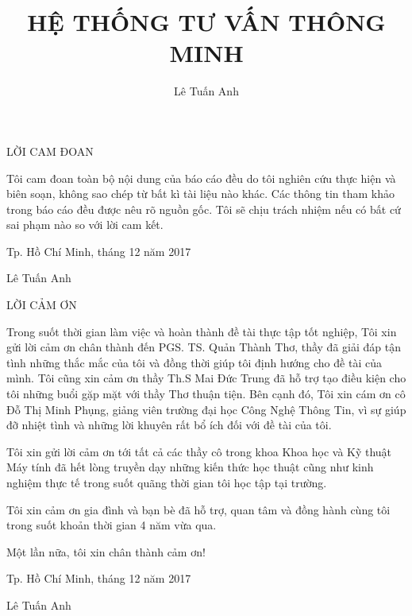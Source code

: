 \documentclass[a4paper,12pt,numbered,print,index,custombib, oneside, custommargin]{report}
\title{HỆ THỐNG TƯ VẤN THÔNG MINH}
\author{Lê Tuấn Anh}
\begin{document}
\maketitle
\begin{center}
\Huge{LỜI CAM ĐOAN}
\end{center}
Tôi cam đoan toàn bộ nội dung của báo cáo đều do tôi nghiên cứu thực hiện và biên soạn, không sao chép từ bất kì tài liệu nào khác. Các thông tin tham khảo trong báo cáo đều được nêu rõ nguồn gốc. Tôi sẽ chịu trách nhiệm nếu có bất cứ sai phạm nào so với lời cam kết. \par

\begin{flushright}
Tp. Hồ Chí Minh, tháng 12 năm 2017 \par
Lê Tuấn Anh
\end{flushright}

\pagebreak

\begin{center}
\Huge{LỜI CẢM ƠN}
\end{center}
Trong suốt thời gian làm việc và hoàn thành đề tài thực tập tốt nghiệp, Tôi xin gửi lời cảm ơn chân thành đến PGS. TS. Quản Thành Thơ, thầy đã giải đáp tận tình những thắc mắc của tôi và đồng thời giúp tôi định hướng cho đề tài của mình. Tôi cũng xin cảm ơn thầy Th.S Mai Đức Trung đã hỗ trợ tạo điều kiện cho tôi những buổi gặp mặt với thầy Thơ thuận tiện. Bên cạnh đó, Tôi xin cám ơn cô Đỗ Thị Minh Phụng, giảng viên trường đại học Công Nghệ Thông Tin, vì sự giúp đỡ nhiệt tình và những lời khuyên rất bổ ích đối với đề tài của tôi. \par 
Tôi xin gửi lời cảm ơn tới tất cả các thầy cô trong khoa Khoa học và Kỹ thuật Máy tính đã hết lòng truyền dạy những kiến thức học thuật cũng như kinh nghiệm thực tế trong suốt quãng thời gian tôi học tập tại trường. \par 
Tôi xin cảm ơn gia đình và bạn bè đã hỗ trợ, quan tâm và đồng hành cùng tôi trong suốt khoản thời gian 4 năm vừa qua. \par
Một lần nữa, tôi xin chân thành cảm ơn! \par

\begin{flushright}
Tp. Hồ Chí Minh, tháng 12 năm 2017 \par
Lê Tuấn Anh
\end{flushright}

\pagebreak

\tableofcontents

\listoffigures
\end{document}
